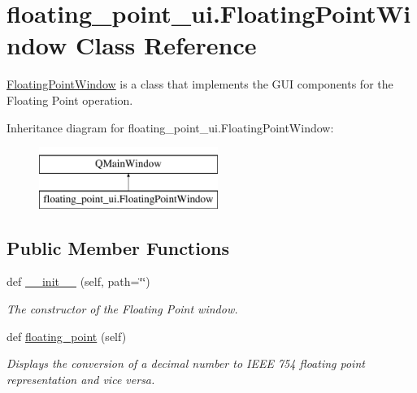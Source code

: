 \hypertarget{classfloating__point__ui_1_1_floating_point_window}{}\section{floating\+\_\+point\+\_\+ui.\+Floating\+Point\+Window Class Reference}
\label{classfloating__point__ui_1_1_floating_point_window}


\hyperlink{classfloating__point__ui_1_1_floating_point_window}{Floating\+Point\+Window} is a class that implements the G\+UI components for the Floating Point operation.  


Inheritance diagram for floating\+\_\+point\+\_\+ui.\+Floating\+Point\+Window\+:\begin{figure}[H]
\begin{center}
\leavevmode
\includegraphics[height=2.000000cm]{classfloating__point__ui_1_1_floating_point_window}
\end{center}
\end{figure}
\subsection*{Public Member Functions}
\begin{DoxyCompactItemize}
\item 
def \hyperlink{classfloating__point__ui_1_1_floating_point_window_ab5a1e532591e07c6ad7603c561532979}{\+\_\+\+\_\+init\+\_\+\+\_\+} (self, path=\char`\"{}\char`\"{})
\begin{DoxyCompactList}\small\item\em The constructor of the Floating Point window. \end{DoxyCompactList}\item 
def \hyperlink{classfloating__point__ui_1_1_floating_point_window_a3e36de9fde9b6387740d13a644fdfc56}{floating\+\_\+point} (self)
\begin{DoxyCompactList}\small\item\em Displays the conversion of a decimal number to I\+E\+EE 754 floating point representation and vice versa. \end{DoxyCompactList}\end{DoxyCompactItemize}
